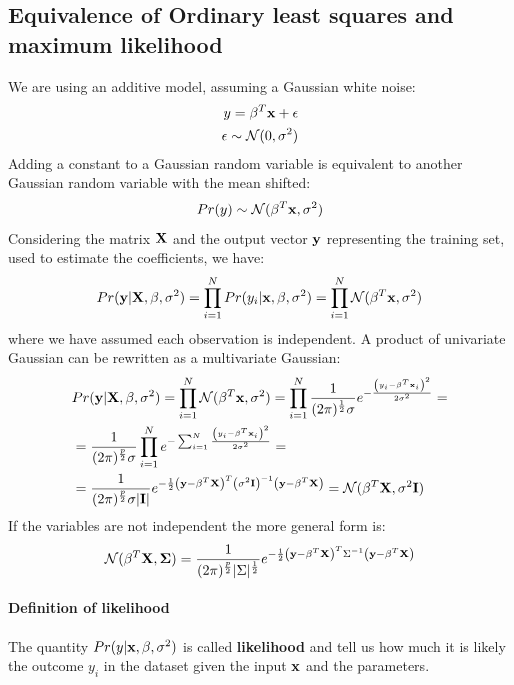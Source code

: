 \subsection{Equivalence of Ordinary least squares and maximum likelihood}
We are using an additive model, assuming a Gaussian white noise:
\begin{align}
y = \beta^T \x + \epsilon \\
\epsilon \sim \CMcal{N}(0,\sigma^2)
\end{align}
Adding a constant to a Gaussian random variable is equivalent to another Gaussian random variable with the mean shifted:
\begin{equation}
Pr(y) \sim \CMcal{N}(\beta^T \x ,\sigma^2)
\end{equation}
Considering the matrix $\mathrm{\mathbf{X}}$ and the output vector $\mathbf{y}$ representing the training set, used to estimate the coefficients, we have:
\begin{equation}
Pr(\y|\X, \beta, \sigma^2)  = \prod_{i=1}^N Pr(y_i|\x, \beta, \sigma^2) =  \prod_{i=1}^N \CMcal{N}(\beta^T \x ,\sigma^2)
\end{equation}
where we have assumed each observation is independent. A product of univariate Gaussian can be rewritten as a multivariate Gaussian:
\begin{equation}
\label{multiGauss}
\begin{aligned}
 &Pr(\y|\X, \beta, \sigma^2)  = \prod_{i=1}^N \CMcal{N}(\beta^T \x ,\sigma^2) =  \prod_{i=1}^N \frac{1}{(2\pi)^{\frac{1}{2}}\sigma}e^{-\frac{\left(y_i-\beta^T\x_i\right)^2} {2\sigma^2}}= \\
 &= \frac{1}{(2\pi)^{\frac{p}{2}}\sigma}\prod_{i=1}^N e^{-\sum_{i=1}^N \frac{\left(y_i-\beta^T\x_i\right)^2} {2\sigma^2}} = \\
 &=  \frac{1}{(2\pi)^{\frac{p}{2}}\sigma|\mathbf{I}|}e^{-\frac{1}{2}\left(\y-\beta^T\X\right)^T\left(\sigma^2 \mathbf{I}\right)^{-1}\left(\y-\beta^T\X\right)} = \CMcal{N}(\beta^T \X ,\sigma^2\mathbf{I}) 
\end{aligned}
\end{equation}
If the variables are not independent the more general form is:
\begin{equation}
\CMcal{N}(\beta^T \X ,\mathbf{\Sigma}) =\frac{1}{(2\pi)^{\frac{p}{2}}|\Sigma|^\frac{1}{2}}e^{-\frac{1}{2}\left(\y-\beta^T\X\right)^T\Sigma^{-1}\left(\y-\beta^T\X\right)}
\end{equation}

\paragraph{Definition of likelihood}
The quantity $Pr(y|\mathbf{x}, \beta, \sigma^2)$ is called \textbf{likelihood} and tell us how much it is likely the outcome $y_i$ in the dataset given the input $\mathbf{x}$ and the parameters.

